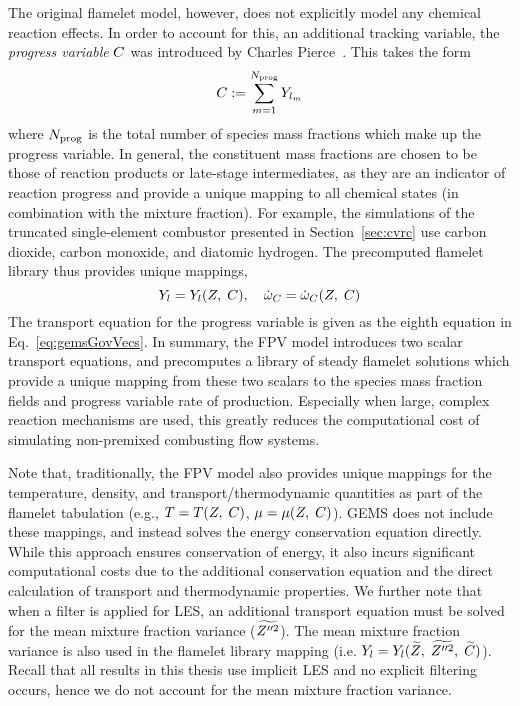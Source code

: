 The original flamelet model, however, does not explicitly model any chemical reaction effects. In order to account for this, an additional tracking variable, the \textit{progress variable} $C$ was introduced by Charles Pierce~\cite{Pierce2001}. This takes the form
%
\begin{equation}\label{eq:progVarDef}
	C := \sum_{m = 1}^{N_{\text{prog}}} Y_{l_{m}}
\end{equation}
%
where $N_{\text{prog}}$ is the total number of species mass fractions which make up the progress variable. In general, the constituent mass fractions are chosen to be those of reaction products or late-stage intermediates, as they are an indicator of reaction progress and provide a unique mapping to all chemical states (in combination with the mixture fraction). For example, the simulations of the truncated single-element combustor presented in Section~\ref{sec:cvrc} use carbon dioxide, carbon monoxide, and diatomic hydrogen. The precomputed flamelet library thus provides unique mappings,
%
\begin{equation}
	Y_{l} = Y_{l}(Z, \; C), \quad \dot{\omega}_{C} = \dot{\omega}_{C}(Z, \; C)
\end{equation}
%
The transport equation for the progress variable is given as the eighth equation in Eq.~\ref{eq:gemsGovVecs}. In summary, the FPV model introduces two scalar transport equations, and precomputes a library of steady flamelet solutions which provide a unique mapping from these two scalars to the species mass fraction fields and progress variable rate of production. Especially when large, complex reaction mechanisms are used, this greatly reduces the computational cost of simulating non-premixed combusting flow systems.

Note that, traditionally, the FPV model also provides unique mappings for the temperature, density, and transport/thermodynamic quantities as part of the flamelet tabulation (e.g., $T = T(Z, \; C)$, $\mu = \mu(Z, \; C)$). GEMS does not include these mappings, and instead solves the energy conservation equation directly. While this approach ensures conservation of energy, it also incurs significant computational costs due to the additional conservation equation and the direct calculation of transport and thermodynamic properties. We further note that when a filter is applied for LES, an additional transport equation must be solved for the mean mixture fraction variance ($\widetilde{Z''^2}$). The mean mixture fraction variance is also used in the flamelet library mapping (i.e. $Y_{l} = Y_{l}(\widetilde{Z}, \; \widetilde{Z''^2}, \; \widetilde{C})$). Recall that all results in this thesis use implicit LES and no explicit filtering occurs, hence we do not account for the mean mixture fraction variance.